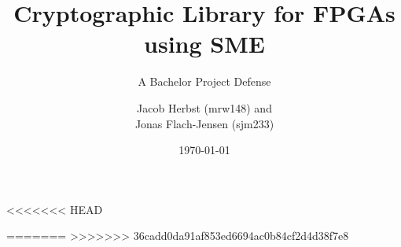 \documentclass[10pt,t]{beamer}
\title{Cryptographic Library for FPGAs using SME}
\subtitle{A Bachelor Project Defense}
\author{Jacob Herbst (mrw148) and\\
  Jonas Flach-Jensen (sjm233)}
\institute[DIKU]{Institute of Computer Science (DIKU)}
\date[]{\today}
\begin{document}
\frame[plain]{\titlepage}



<<<<<<< HEAD



=======
% 
% 
>>>>>>> 36cadd0da91af853ed6694ac0b84cf2d4d38f7e8
\end{document}

